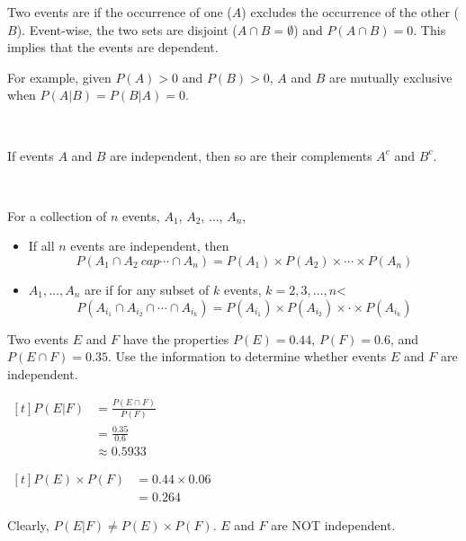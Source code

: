 \begin{definition}
    Two events are  if the occurrence of one ($A$) excludes the occurrence of the other ($B$). Event-wise, the two sets are disjoint ($A \cap B = \emptyset$) and $P(A \cap B) = 0$. This implies that the events are dependent.
\end{definition}

For example, given $P(A) > 0$ and $P(B) > 0$, $A$ and $B$ are mutually exclusive when $P(A | B) = P(B | A) = 0$.

{~~~}

If events $A$ and $B$ are independent, then so are their complements $A^c$ and $B^c$. 

{~~~}

For a collection of $n$ events, $A_1$, $A_2$, $\dots$, $A_n$, 

\begin{itemize}
    \item If all $n$ events are independent, then $$P(A_1 \cap A_2\ cap \cdots \cap A_n) = P(A_1) \times P(A_2) \times \cdots \times P(A_n)$$
    \item $A_1, \dots, A_n$ are  if for any subset of $k$ events, $k = 2, 3, \dots, n$< $$P(A_{i_1} \cap A_{i_2} \cap \cdots \cap A_{i_k}) = P(A_{i_1}) \times P(A_{i_2}) \times \cdot \times P(A_{i_k})$$
\end{itemize}

\begin{example}
    Two events $E$ and $F$ have the properties $P(E) = 0.44$, $P(F) = 0.6$, and $P(E \cap F) = 0.35$. Use the information to determine whether events $E$ and $F$ are independent. 

    \begin{minipage}[t]{0.45\linewidth}
        $\begin{aligned}[t]
            P(E | F) & = \frac{P(E \cap F)}{P(F)} \\
                     & = \frac{0.35}{0.6}         \\
                     & \approx 0.5933
        \end{aligned}$
    \end{minipage}
    \begin{minipage}[t]{0.45\linewidth}
        $\begin{aligned}[t]
            P(E) \times P(F) & = 0.44 \times 0.06 \\
                             & = 0.264
        \end{aligned}$
    \end{minipage}

    Clearly, $P(E | F) \neq P(E) \times P(F)$. $E$ and $F$ are NOT independent. 
\end{example}

